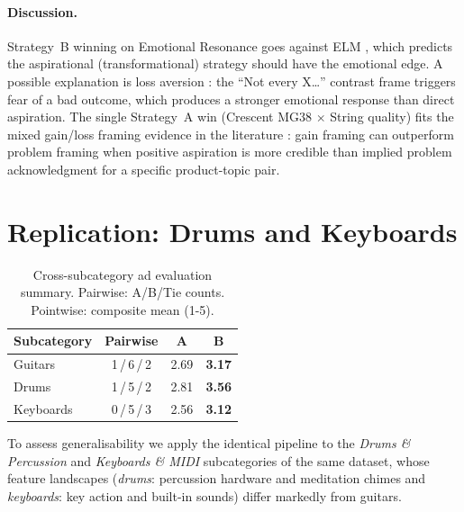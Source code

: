 \documentclass[11pt]{article}
\begin{document}
\paragraph{Discussion.}
Strategy~B winning on Emotional Resonance goes against ELM
\cite{petty1986elm}, which predicts the aspirational
(transformational) strategy should have the emotional edge.
A possible explanation is loss aversion \cite{kahneman1979prospect}:
the ``Not every X\ldots'' contrast frame triggers fear of a bad
outcome, which produces a stronger emotional response than direct
aspiration.
The single Strategy~A win (Crescent MG38 $\times$ String quality)
fits the mixed gain/loss framing evidence in the literature
\cite{rothman1997shaping}: gain framing can outperform problem
framing when positive aspiration is more credible than implied
problem acknowledgment for a specific product-topic pair.

\section{Replication: Drums and Keyboards}
\label{sec:rep}

\begin{table}[t]
\centering
\small
\setlength{\tabcolsep}{4pt}
\caption{Cross-subcategory ad evaluation summary.
Pairwise: A/B/Tie counts.
Pointwise: composite mean (1-5).}
\label{tab:rep}
\begin{tabular}{lccc}
\toprule
\textbf{Subcategory} & \textbf{Pairwise} & \textbf{A} & \textbf{B} \\
\midrule
Guitars     & 1\,/\,6\,/\,2 & 2.69 & \textbf{3.17} \\
Drums       & 1\,/\,5\,/\,2 & 2.81 & \textbf{3.56} \\
Keyboards   & 0\,/\,5\,/\,3 & 2.56 & \textbf{3.12} \\
\bottomrule
\end{tabular}
\end{table}

To assess generalisability we apply the identical pipeline to the
\textit{Drums \& Percussion} and \textit{Keyboards \& MIDI}
subcategories of the same dataset, whose feature landscapes
(\textit{drums}: percussion hardware and meditation chimes and \textit{keyboards}: key action and
built-in sounds) differ markedly from guitars.
\end{document}
